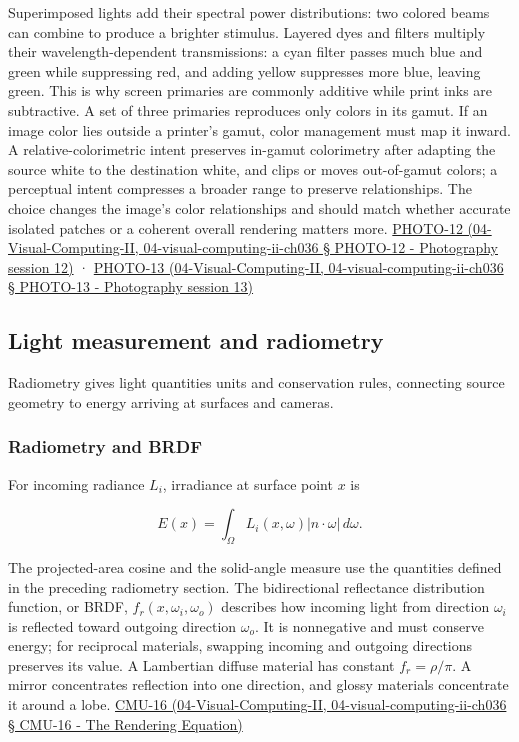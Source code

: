 Superimposed lights add their spectral power distributions: two colored beams can combine to produce a brighter stimulus. Layered dyes and filters multiply their wavelength-dependent transmissions: a cyan filter passes much blue and green while suppressing red, and adding yellow suppresses more blue, leaving green. This is why screen primaries are commonly additive while print inks are subtractive. A set of three primaries reproduces only colors in its gamut. If an image color lies outside a printer's gamut, color management must map it inward. A relative-colorimetric intent preserves in-gamut colorimetry after adapting the source white to the destination white, and clips or moves out-of-gamut colors; a perceptual intent compresses a broader range to preserve relationships. The choice changes the image's color relationships and should match whether accurate isolated patches or a coherent overall rendering matters more. \href{}{PHOTO-12 (04-Visual-Computing-II, 04-visual-computing-ii-ch036 § PHOTO-12 - Photography session 12)} · \href{}{PHOTO-13 (04-Visual-Computing-II, 04-visual-computing-ii-ch036 § PHOTO-13 - Photography session 13)}

\subsection{Light measurement and radiometry}\label{light-measurement-and-radiometry}

Radiometry gives light quantities units and conservation rules, connecting source geometry to energy arriving at surfaces and cameras.

\subsubsection{Radiometry and BRDF}\label{radiometry-and-brdf}

For incoming radiance \(L_i\), irradiance at surface point \(x\) is

\[
E(x)=\int_\Omega L_i(x,\omega)|n\cdot\omega|\,d\omega.
\]

The projected-area cosine and the solid-angle measure use the quantities defined in the preceding radiometry section. The bidirectional reflectance distribution function, or BRDF, \(f_r(x,\omega_i,\omega_o)\) describes how incoming light from direction \(\omega_i\) is reflected toward outgoing direction \(\omega_o\). It is nonnegative and must conserve energy; for reciprocal materials, swapping incoming and outgoing directions preserves its value. A Lambertian diffuse material has constant \(f_r=\rho/\pi\). A mirror concentrates reflection into one direction, and glossy materials concentrate it around a lobe. \href{}{CMU-16 (04-Visual-Computing-II, 04-visual-computing-ii-ch036 § CMU-16 - The Rendering Equation)}

